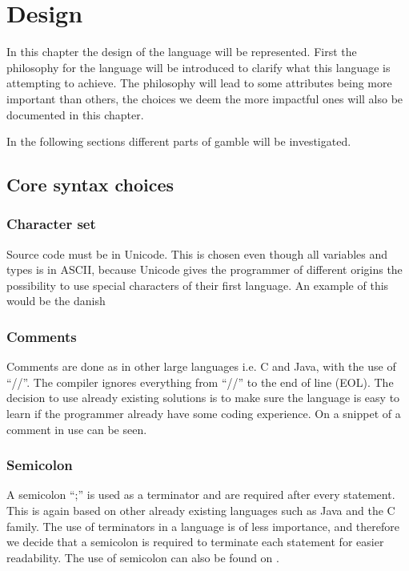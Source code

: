 \chapter{Design}
\label{cha:Design}
In this chapter the design of the language will be represented.
First the philosophy for the language will be introduced to clarify what this language is attempting to achieve.
The philosophy will lead to some attributes being more important than others, the choices we deem the more impactful ones will also be documented in this chapter.



In the following sections different parts of \gls{gamble} will be investigated.

\section{Core syntax choices}

\subsection*{Character set}
Source code must be in Unicode.
This is chosen even though all variables and types is in ASCII, because Unicode gives the programmer of different origins the possibility to use special characters of their first language.
An example of this would be the danish %

\subsection*{Comments}
Comments are done as in other large languages i.e. C and Java, with the use of ``//''.
The compiler ignores everything from ``//'' to the end of line (EOL).
The decision to use already existing solutions is to make sure the language is easy to learn if the programmer already have some coding experience.
On  a snippet of a comment in use can be seen.

\subsection*{Semicolon}
A semicolon ``;'' is used as a terminator and are required after every statement.
This is again based on other already existing languages such as Java and the C family.
The use of terminators in a language is of less importance, and therefore we decide that a semicolon is required to terminate each statement for easier readability.
The use of semicolon can also be found on .

